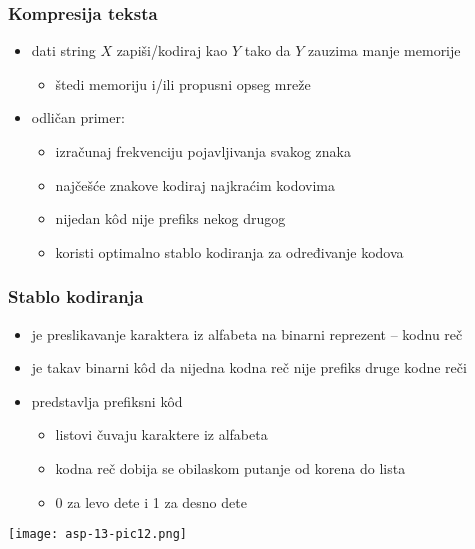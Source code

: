 \documentclass[compress,aspectratio=169]{beamer}
\begin{document}
\begin{frame}[fragile]
  \frametitle{Kompresija teksta}
  \begin{itemize}
    \item dati string $X$ zapiši/kodiraj kao $Y$ tako da $Y$ zauzima 
    manje memorije 
    \begin{itemize}
      \item štedi memoriju i/ili propusni opseg mreže
    \end{itemize}
    \item odličan primer:  
    \begin{itemize}
      \item izračunaj frekvenciju pojavljivanja svakog znaka
      \item najčešće znakove kodiraj najkraćim kodovima
      \item nijedan kôd nije prefiks nekog drugog
      \item koristi optimalno stablo kodiranja za određivanje kodova
    \end{itemize}
  \end{itemize}
\end{frame}

\begin{frame}[fragile]
  \frametitle{Stablo kodiranja}
  \begin{itemize}
    \item {} je preslikavanje karaktera iz alfabeta na binarni 
    reprezent -- kodnu reč
    \item {} je takav binarni kôd da nijedna kodna 
    reč nije prefiks druge kodne reči
    \item {} predstavlja prefiksni kôd
    \begin{itemize}
      \item listovi čuvaju karaktere iz alfabeta
      \item kodna reč dobija se obilaskom putanje od korena do lista
      \item 0 za levo dete i 1 za desno dete
    \end{itemize}
  \end{itemize}
  \begin{center}
    \texttt{[image: asp-13-pic12.png]}
  \end{center}
\end{frame}
\end{document}
